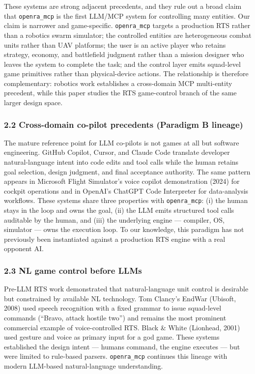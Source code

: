 \documentclass[
  journal]{IEEEtran}
\begin{document}
These systems are strong adjacent precedents, and they rule out a broad
claim that \texttt{openra\_mcp} is the first LLM/MCP system for
controlling many entities. Our claim is narrower and game-specific.
\texttt{openra\_mcp} targets a production RTS rather than a robotics
swarm simulator; the controlled entities are heterogeneous combat units
rather than UAV platforms; the user is an active player who retains
strategy, economy, and battlefield judgment rather than a mission
designer who leaves the system to complete the task; and the control
layer emits squad-level game primitives rather than physical-device
actions. The relationship is therefore complementary: robotics work
establishes a cross-domain MCP multi-entity precedent, while this paper
studies the RTS game-control branch of the same larger design space.

\subsubsection{2.2 Cross-domain co-pilot precedents (Paradigm B
lineage)}\label{cross-domain-co-pilot-precedents-paradigm-b-lineage}

The mature reference point for LLM co-pilots is not games at all but
software engineering. GitHub Copilot, Cursor, and Claude Code translate
developer natural-language intent into code edits and tool calls while
the human retains goal selection, design judgment, and final acceptance
authority. The same pattern appears in Microsoft Flight Simulator's
voice copilot demonstration (2024) for cockpit operations and in
OpenAI's ChatGPT Code Interpreter for data-analysis workflows. These
systems share three properties with \texttt{openra\_mcp}: (i) the human
stays in the loop and owns the goal, (ii) the LLM emits structured tool
calls auditable by the human, and (iii) the underlying engine ---
compiler, OS, simulator --- owns the execution loop. To our knowledge,
this paradigm has not previously been instantiated against a production
RTS engine with a real opponent AI.

\subsubsection{2.3 NL game control before
LLMs}\label{nl-game-control-before-llms}

Pre-LLM RTS work demonstrated that natural-language unit control is
desirable but constrained by available NL technology. Tom Clancy's
EndWar (Ubisoft, 2008) used speech recognition with a fixed grammar to
issue squad-level commands (``Bravo, attack hostile two'') and remains
the most prominent commercial example of voice-controlled RTS. Black \&
White (Lionhead, 2001) used gesture and voice as primary input for a god
game. These systems established the design intent --- humans command,
the engine executes --- but were limited to rule-based parsers.
\texttt{openra\_mcp} continues this lineage with modern LLM-based
natural-language understanding.
\end{document}
